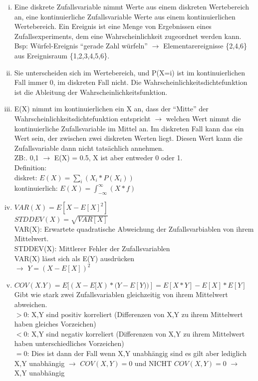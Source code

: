 \documentclass[a4paper]{scrartcl}
\begin{document}
\begin{enumerate}[a)]
	\begin{enumerate}[(i)]
		\item Eine diskrete Zufallsvariable nimmt Werte aus einem diskreten Wertebereich an, eine kontinuierliche Zufallsvariable Werte aus einem kontinuierlichen Wertebereich.
		Ein Ereignis ist eine Menge von Ergebnissen eines Zufallsexperiments, dem eine Wahrscheinlichkeit zugeordnet werden kann. Bsp: Würfel-Ereignis “gerade Zahl würfeln” $\rightarrow$ Elementarereignisse \{2,4,6\} aus Ereignisraum \{1,2,3,4,5,6\}.
		
		\item Sie unterscheiden sich im Wertebereich, und P(X=i) ist im kontinuierlichen Fall immer 0, im diskreten Fall nicht.
		Die Wahrscheinlichkeitsdichtefunktion ist die Ableitung der Wahrscheinlichkeitsfunktion. 
		\item E(X) nimmt im kontinuierlichen ein X an, dass der “Mitte” der Wahrscheinlichkeitsdichtefunktion entspricht $\rightarrow$ welchen Wert nimmt die kontinuierliche Zufallsvariable im Mittel an.
		Im diskreten Fall kann das ein Wert sein, der zwischen zwei diskreten Werten liegt. Diesen Wert kann die Zufallsvariable dann nicht tatsächlich annehmen.\\
		ZB:. {0,1} $\rightarrow$ E(X) = 0.5, X ist aber entweder 0 oder 1.\\
		Definition: \\
		diskret: $E(X)=\sum_i(X_i*P(X_i))$ \\
		kontinuierlich: $E(X)= \int_{-\infty}^{\infty}(X*f)$ 
		
		\item 
		$VAR(X) = E[ X-E[X]^2]$\\
		$STDDEV(X) = \sqrt{VAR[X]}$\\
		VAR(X): Erwartete quadratische Abweichung der Zufallsvarbiablen von ihrem Mittelwert.\\
		STDDEV(X): Mittlerer Fehler der Zufallsvariablen\\
		VAR(X) lässt sich als E(Y) ausdrücken\\ $\rightarrow$ 
		$Y= (X-E[X])^2$
		
		\item $COV(X.Y) = E[(X-E[X)*(Y-E[Y))] = E[X*Y]-E[X]*E[Y]$\\
		Gibt wie stark zwei Zufallsvariablen gleichzeitig von ihrem Mittelwert abweichen.\\
		$>0$: X,Y sind positiv korreliert (Differenzen von X,Y zu ihrem Mittelwert haben gleiches Vorzeichen)\\
		$<0$: X,Y sind negativ korreliert (Differenzen von X,Y zu ihrem Mittelwert haben unterschiedliches Vorzeichen)\\
		$=0$: Dies ist dann der Fall wenn X,Y unabhängig sind es gilt aber lediglich X,Y unabhängig $\rightarrow$ $COV(X,Y)=0$ und NICHT $COV(X,Y)=0$ $\rightarrow$ X,Y unabhängig 
	\end{enumerate}
	

\end{enumerate}
\end{document}
